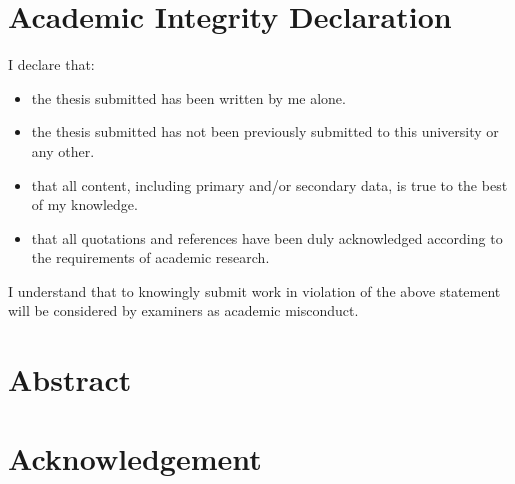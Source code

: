 \documentclass[12pt]{article}
\begin{document}


\clearpage
\pagestyle{plain}
\pagestyle{fancy}
\fancyhead[R]{} 
\fancyhead[L]{}
\clearpage



\section*{Academic Integrity Declaration}

I declare that:

\begin{itemize}
  \item  the thesis submitted has been written by me alone.
  \item  the thesis submitted has not been previously submitted to this university or any
other.
\item  that all content, including primary and/or secondary data, is true to the best of my
knowledge.
\item  that all quotations and references have been duly acknowledged according to the
requirements of academic research.
\end{itemize} 

I understand that to knowingly submit work in violation of the above statement will be
considered by examiners as academic misconduct.



\clearpage
\pagestyle{plain}
\pagestyle{fancy}
\fancyhead[L]{}
\clearpage



\section*{Abstract}




\clearpage
\pagestyle{plain}
\pagestyle{fancy}
\fancyhead[L]{}
\clearpage



\section*{Acknowledgement}






\clearpage
{
  \hypersetup{linkcolor=black}
  \pagestyle{fancy}
    \fancyhead[L]{}
  \tableofcontents
  \clearpage
    \pagestyle{fancy}
    \fancyhead[L]{}
  \listoffigures
  \clearpage
    \pagestyle{fancy}
    \fancyhead[L]{}
  \listoftables
}
\end{document}
